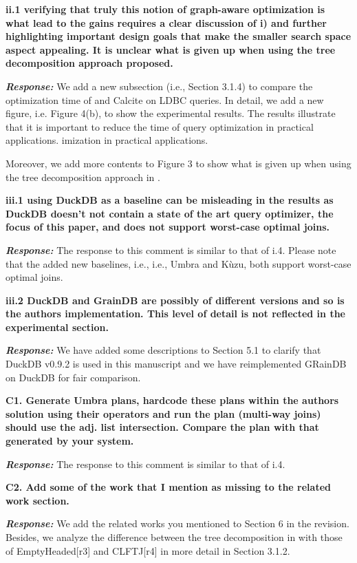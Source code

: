 \textbf{
ii.1 verifying that truly this notion of graph-aware optimization is what lead to the gains requires a clear discussion of i) and further highlighting important design goals that make the smaller search space aspect appealing.
It is unclear what is given up when using the tree decomposition approach proposed.}

\textbf{\textit{Response: }}
We add a new subsection (i.e., Section 3.1.4) to compare the optimization time of \name and Calcite on LDBC queries.
In detail, we add a new figure, i.e. Figure 4(b), to show the experimental results.
The results illustrate that it is important to reduce the time of query optimization in practical applications. 
imization in practical applications. 

Moreover, we add more contents to Figure 3 to show what is given up when using the tree decomposition approach in \name.


\textbf{
iii.1 using DuckDB as a baseline can be misleading in the results
as DuckDB doesn't not contain a state of the art query optimizer, the focus of this paper, and does not support worst-case optimal joins.}

\textbf{\textit{Response: }}
The response to this comment is similar to that of i.4.
Please note that the added new baselines, i.e., i.e., Umbra and K\`uzu, both support worst-case optimal joins.


\textbf{
iii.2 DuckDB and GrainDB are possibly of different versions and so is the authors implementation. This level of detail is not reflected in the experimental section.}

\textbf{\textit{Response: }}
We have added some descriptions to Section 5.1 to clarify that DuckDB v0.9.2 is used in this manuscript and we have reimplemented GRainDB on DuckDB for fair comparison.


\textbf{
C1. Generate Umbra plans, hardcode these plans within the authors solution using their operators and run the plan (multi-way joins) should use the adj. list intersection. Compare the plan with that generated by your system. }

\textbf{\textit{Response: }}
The response to this comment is similar to that of i.4.

\textbf{
C2. Add some of the work that I mention as missing to the related work section.}

\textbf{\textit{Response: }} We add the related works you mentioned to Section 6 in the revision. Besides, we analyze the difference between the tree decomposition in \name with those of EmptyHeaded[r3] and CLFTJ[r4] in more detail in Section 3.1.2.


